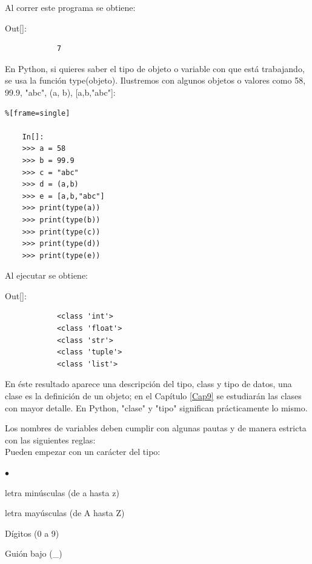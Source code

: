 Al  correr este programa se obtiene:\\

{\ttfamily\scriptsize\scriptsize 
	\hspace{-0.65cm}Out[]:\vspace{-0.2cm}	
	{\color{blue} 	
		\begin{verbatim}
			7
		\end{verbatim}
}}

En Python, si quieres saber el tipo de objeto o variable con que está trabajando, se  usa la función {\ttfamily type(objeto)}. Ilustremos con algunos objetos o valores como 58, 99.9, "{}abc", (a, b), [a,b,"{}abc"]:\\

\begin{lstlisting}%[frame=single]
	
	In[]:
	>>> a = 58
	>>> b = 99.9
	>>> c = "abc"
	>>> d = (a,b)
	>>> e = [a,b,"abc"]
	>>> print(type(a))
	>>> print(type(b))
	>>> print(type(c))
	>>> print(type(d))
	>>> print(type(e))
\end{lstlisting}


Al  ejecutar se obtiene:\\

{\ttfamily\scriptsize\scriptsize 
	\hspace{-0.65cm}Out[]:\vspace{-0.2cm}
	{\color{blue} 	
		\begin{verbatim}
			<class 'int'>
			<class 'float'>    
			<class 'str'>
			<class 'tuple'>
			<class 'list'>
		\end{verbatim}
}}

En éste resultado aparece una descripción del tipo, {\ttfamily class} y tipo de datos, una clase es la definición de un objeto; en el Capítulo  \ref{Cap9}  se estudiarán las clases con mayor detalle. En Python, "{}clase{}"{} y {}"{}tipo"{} significan prácticamente lo mismo.


Los nombres de variables deben cumplir con algunas pautas y de manera estricta
con las siguientes reglas: \\

Pueden empezar con un carácter del tipo:\vspace{-0.2cm}
\begin{list}{$\bullet$}{} 
	\item letra minúsculas (de  a hasta z)
	\item letra mayúsculas (de  A hasta Z)
	\item Dígitos (0 a 9)
	\item Guión bajo (\_) 	
\end{list}

